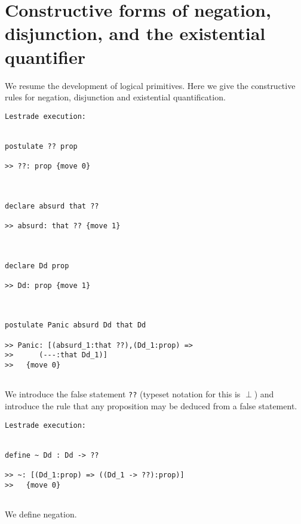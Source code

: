 \documentclass[12pt]{article}
\begin{document}
\section{Constructive forms of negation, disjunction, and the existential quantifier}

We resume the development of logical primitives.  Here we give the constructive rules for negation, disjunction and existential quantification.

\begin{verbatim}Lestrade execution:


postulate ?? prop

>> ??: prop {move 0}



declare absurd that ??

>> absurd: that ?? {move 1}



declare Dd prop

>> Dd: prop {move 1}



postulate Panic absurd Dd that Dd

>> Panic: [(absurd_1:that ??),(Dd_1:prop) =>
>>      (---:that Dd_1)]
>>   {move 0}


\end{verbatim}

We introduce the false statement {\tt ??} (typeset notation for this is $\perp$) and introduce the rule that any proposition may be deduced from a false statement.

\begin{verbatim}Lestrade execution:


define ~ Dd : Dd -> ??

>> ~: [(Dd_1:prop) => ((Dd_1 -> ??):prop)]
>>   {move 0}


\end{verbatim}

We define negation.
\end{document}
